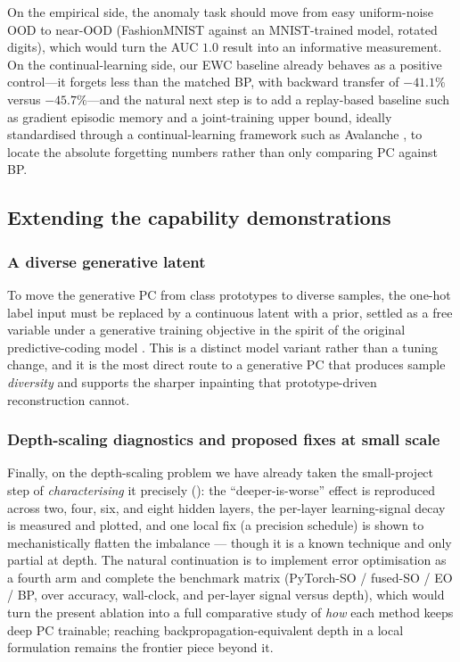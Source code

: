 On the empirical side, the anomaly task should move from easy uniform-noise OOD to
near-OOD (FashionMNIST against an MNIST-trained model, rotated digits), which would
turn the AUC $1.0$ result into an informative measurement. On the
continual-learning side, our EWC baseline \citep{kirkpatrick2017ewc} already behaves
as a positive control---it forgets less than the matched BP, with backward transfer
of $-41.1\%$ versus $-45.7\%$---and the natural next step is to add a replay-based
baseline such as gradient episodic memory \citep{lopezpaz2017gem} and a joint-training
upper bound, ideally standardised through a continual-learning framework such as
Avalanche \citep{lomonaco2021avalanche}, to locate the absolute forgetting numbers
rather than only comparing PC against BP.

\subsection{Extending the capability demonstrations}

\subsubsection{A diverse generative latent}

To move the generative PC from class prototypes to diverse samples, the one-hot label
input must be replaced by a continuous latent with a prior, settled as a free
variable under a generative training objective in the spirit of the original
predictive-coding model \citep{rao1999predictive}. This is a distinct
model variant rather than a tuning change, and it is the most direct route to a
generative PC that produces sample \emph{diversity} and supports the sharper
inpainting that prototype-driven reconstruction cannot.

\subsubsection{Depth-scaling diagnostics and proposed fixes at small scale}

Finally, on the depth-scaling problem we have already taken the small-project step of
\emph{characterising} it precisely (): the ``deeper-is-worse''
effect is reproduced across two, four, six, and eight hidden layers, the per-layer
learning-signal decay is measured and plotted, and one local fix (a precision schedule)
is shown to mechanistically flatten the imbalance --- though it is a known technique and
only partial at depth. The natural continuation is to implement error optimisation
\citep{goemaere2025epc} as a fourth arm and complete the benchmark matrix (PyTorch-SO /
fused-SO / EO / BP, over accuracy, wall-clock, and per-layer signal versus depth), which
would turn the present ablation into a full comparative study of \emph{how} each method
keeps deep PC trainable; reaching backpropagation-equivalent depth in a local formulation
remains the frontier piece beyond it.

